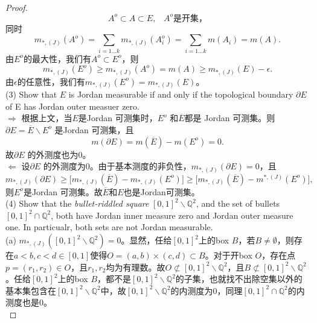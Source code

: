\documentclass[reqno,a4paper,14pt]{amsart}
\begin{document}
\begin{proof}
\begin{equation*}
        A^o\subset A\subset E,\;\;\;A^o\text{是开集，}
    \end{equation*}
    同时
    \begin{equation*}
        m_{*,(J)}(A^o)= \sum_{i=1...k}m_{*,(J)}(A^o_i)=\sum_{i=1...k}m(A_i)=m(A).
    \end{equation*}
    由$E^o$的最大性，我们有$A^o\subset E^o$，则
    \begin{equation*}
        m_{*,(J)}(E^o)\geq m_{*,(J)}(A^o)=m(A)\geq m_{*,(J)}(E)-\epsilon.
    \end{equation*}
    由$\epsilon$的任意性，我们有$m_{*,(J)}(E^o)=m_{*,(J)}(E)$。\\
    (3) Show that $E$ is Jordan measurable if and only if the topological boundary $\partial E$ of E has Jordan outer measuer zero.\\
    \newline
    $\Rightarrow$ 根据上文，当$E$是Jordan 可测集时，$E^o$ 和$\overline{E}$都是 Jordan 可测集。则$\partial E=\overline{E}\backslash E^o$ 是Jordan 可测集，且
    \begin{equation*}
        m(\partial E)=m(\overline{E})-m(E^o)=0.
    \end{equation*}
    故$\partial E$ 的外测度也为0。\\
    $\Leftarrow$ 设$\partial E$ 的外测度为0。由于基本测度的非负性，$m_{*,(J)}(\partial E)=0$，且
    \begin{equation*}
        m_{*,(J)}(\partial E)\geq \biggl[ m_{*,(J)}(\overline{E})-m_{*,(J)}(E^o)\biggr]\geq \biggl[m_{*,(J)}(\overline{E})-m^{*,(J)}(E^o)\biggr],
    \end{equation*}
    则$E^o$是Jordan 可测集。故$\overline{E}$和$E$也是Jordan可测集。\\
    (4) Show that the \textit{bullet-riddled square} $[0,1]^2\backslash \mathbb{Q}^2$, and the set of bullets $[0,1]^2\cap\mathbb{Q}^2$, both have Jordan inner measure zero and Jordan outer measure one. In particualr, both sets are not Jordan measurable.\\
    \newline
    (a) $m_{*,(J)}([0,1]^2\backslash \mathbb{Q}^2)=0$。显然，任给$[0,1]^2$上的box $B$，若$B\neq \emptyset$，则存在$a<b,c<d\in [0,1]$使得$O=(a,b)\times (c,d)\subset B$。对于开box $O$，存在点$p=(r_1,r_2) \in O$，且$r_1,r_2$均为有理数。故$O\not\subset [0,1]^2\backslash \mathbb{Q}^2$，且$B\not\subset [0,1]^2\backslash \mathbb{Q}^2$。任给$[0,1]^2$上的box $B$，都不是$[0,1]^2\backslash \mathbb{Q}^2$的子集，也就找不出除空集以外的基本集包含在$[0,1]^2\backslash \mathbb{Q}^2$中，故$[0,1]^2\backslash \mathbb{Q}^2$的内测度为0，同理$[0,1]^2\cap\mathbb{Q}^2$的内测度也是0。\\

\end{proof}
\end{document}
